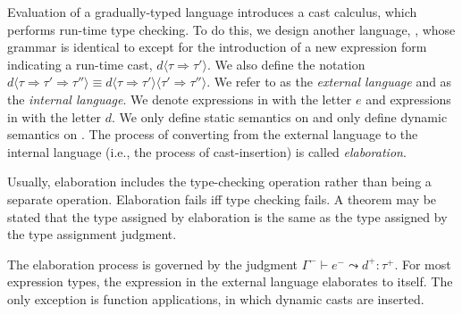 Evaluation of a gradually-typed language introduces a cast calculus, which performs run-time type checking. To do this, we design another language, \gtclc, whose grammar is identical to \gtlc except for the introduction of a new expression form indicating a run-time cast, $d\langle\tau\Rightarrow\tau'\rangle$. We also define the notation $d\langle\tau\Rightarrow\tau'\Rightarrow\tau''\rangle\equiv d\langle\tau\Rightarrow\tau'\rangle\langle\tau'\Rightarrow\tau''\rangle$. We refer to \gtlc as the \textit{external language} and \gtclc as the \textit{internal language}. We denote expressions in \gtlc with the letter $e$ and expressions in \gtclc with the letter $d$. We only define static semantics on \gtlc and only define dynamic semantics on \gtclc. The process of converting from the external language to the internal language (i.e., the process of cast-insertion) is called \textit{elaboration}.

Usually, elaboration includes the type-checking operation rather than being a separate operation. Elaboration fails iff type checking fails. A theorem may be stated that the type assigned by elaboration is the same as the type assigned by the type assignment judgment.

The elaboration process is governed by the judgment $\Gamma^-\vdash e^-\leadsto d^+:\tau^+$. For most expression types, the expression in the external language elaborates to itself. The only exception is function applications, in which dynamic casts are inserted.

\begin{singlespace}
\end{singlespace}

